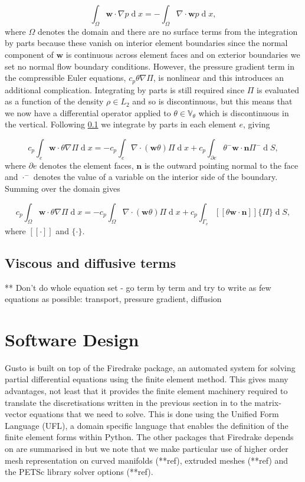 \documentclass[journal abbreviation, manuscript]{copernicus}
\def\MM#1{\boldsymbol{#1}}
\DeclareMathOperator{\diff}{d}
\newcommand{\avg}[1]{\{#1\}}
\newcommand{\jump}[1]{[\![#1]\!]}
\begin{document}
\begin{equation}
\int_\Omega\MM{w}\cdot\nabla p \diff x = -\int_\Omega\nabla\cdot\MM{w}p\diff x,
\end{equation}
where $\Omega$ denotes the domain and there are no surface terms from
the integration by parts because these vanish on interior element
boundaries since the normal component of $\MM{w}$ is continuous across
element faces and on exterior boundaries we set no normal flow
boundary conditions. However, the pressure gradient term in the
compressible Euler equations, $c_p\theta\nabla\Pi$, is nonlinear and
this introduces an additional complication. Integrating by parts is
still required since $\Pi$ is evaluated as a function of the density
$\rho \in L_2$ and so is discontinuous, but this means that we now
have a differential operator applied to $\theta \in \mathbb{V}_\theta$
which is discontinuous in the vertical. Following \ref{} we integrate
by parts in each element $e$, giving

\begin{equation}
  c_p\int_e\MM{w}\cdot\theta\nabla\Pi\diff x = -c_p\int_e\nabla\cdot(\MM{w}\theta)\Pi\diff x + c_p\int_{\partial e}\theta^-\MM{w}\cdot\MM{n}\Pi^- \diff S,
\end{equation}
where $\partial e$ denotes the element faces, $\MM{n}$ is the outward
pointing normal to the face and $\cdot^-$ denotes the value of a
variable on the interior side of the boundary. Summing over the domain
gives

\begin{equation}
  c_p\int_\Omega\MM{w}\cdot\theta\nabla\Pi\diff x = -c_p\int_\Omega\nabla\cdot(\MM{w}\theta)\Pi\diff x + c_p\int_{\Gamma_v}\jump{\theta\MM{w}\cdot\MM{n}}\avg{\Pi} \diff S,
\end{equation}
where $\jump{\cdot}$ and $\avg{\cdot}$.

\subsection{Viscous and diffusive terms}

** Don't do whole equation set - go term by term and try to write as
few equations as possible: transport, pressure gradient, diffusion


\section{Software Design}
\label{sec: design}
Gusto is built on top of the Firedrake package, an automated system
for solving partial differential equations using the finite element
method. This gives many advantages, not least that it provides the
finite element machinery required to translate the discretisations
written in the previous section in to the matrix-vector equations that
we need to solve. This is done using the Unified Form Language (UFL),
a domain specific language that enables the definition of the finite
element forms within Python. The other packages that Firedrake depends
on are summarised in \citet{davies2022towards} but we note that we
make particular use of higher order mesh representation on curved
manifolds (**ref), extruded meshes (**ref) and the PETSc library
solver options (**ref).
\end{document}

